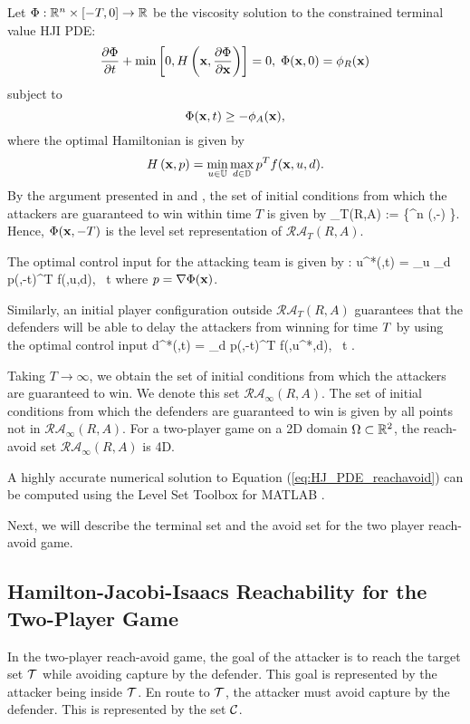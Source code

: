 Let $\Phi:\mathbb{R}^n\times[-T,0]\rightarrow\mathbb{R}$ be the viscosity solution \cite{j:Crandall-TAMS-1983} to the constrained terminal value HJI PDE:
\begin{equation}
	\label{eq:HJ_PDE_reachavoid}
	\frac{\partial \Phi}{\partial t} + \min \left[0, H\left(\xj,\frac{\partial \Phi}{\partial \xj}\right)\right] = 0,\;\Phi(\xj,0) = \valsR_R(\xj)	 
\end{equation}
subject to 
$$\Phi(\mathbf{x},t) \geq -\phi_A(\mathbf{x}),$$
where the optimal Hamiltonian is given by
$$H\left(\mathbf{x},p\right) = \min_{u \in \mathbb{U}} \max_{d \in \mathbb{D}} p^T f(\mathbf{x},u,d).$$
By the argument presented in \cite{j:mitchell-TAC-2005} and \cite{mitchell-thesis}, the set of initial conditions from which the attackers are guaranteed to win within time $T$ is given by 
\bq
{}_T(R,A) := \left\{\xj\in \R^n \mid \Phi (\xj,-\T) \right\}.
\eq
Hence, $\Phi (\mathbf{x},-T)$ is the level set representation of $\mathcal{RA}_T(R,A)$.

The optimal control input for the attacking team is given by \cite{Huang2011,j:Lygeros-automatica-1999, j:Tomlin-ProcIEEE-2000}:
\bq \label{eq:opt_ctrl_u}
  u^*(\xj,t) = \arg \min_{u \in {}} \max_{d \in {}} p(\xj,-t)^T f(\xj,u,d), \!\ t \in [0,T] 
\eq
where $p = \nabla\Phi(\mathbf{x})$. 

Similarly, an initial player configuration outside $\mathcal{RA}_T(R,A)$ guarantees that the defenders will be able to delay the attackers from winning for time $T$ by using the optimal control input
\bq \label{eq:opt_ctrl_d}
  d^*(\xj,t) = \arg \max_{d \in {}} p(\xj,-t)^T f(\xj,u^*,d), \ t \in [0,T].
\eq

Taking $T\rightarrow\infty$, we obtain the set of initial conditions from which the attackers are guaranteed to win. We denote this set $\mathcal{RA}_\infty(R,A)$. The set of initial conditions from which the defenders are guaranteed to win is given by all points not in $\mathcal{RA}_\infty(R,A)$. For a two-player game on a 2D domain $\Omega\subset\mathbb{R}^2$, the reach-avoid set $\mathcal{RA}_\infty(R,A)$ is 4D.

A highly accurate numerical solution to Equation (\ref{eq:HJ_PDE_reachavoid}) can be computed using the Level Set Toolbox for MATLAB \cite{LSToolbox}.

Next, we will describe the terminal set and the avoid set for the two player reach-avoid game.

\subsection{Hamilton-Jacobi-Isaacs Reachability for the Two-Player Game}
\label{subsec:hj_two}
In the two-player reach-avoid game, the goal of the attacker is to reach the target set $\mathcal{T}$ while avoiding capture by the defender. This goal is represented by the attacker being inside $\mathcal{T}$. En route to $\mathcal{T}$, the attacker must avoid capture by the defender. This is represented by the set $\mathcal{C}$. 

